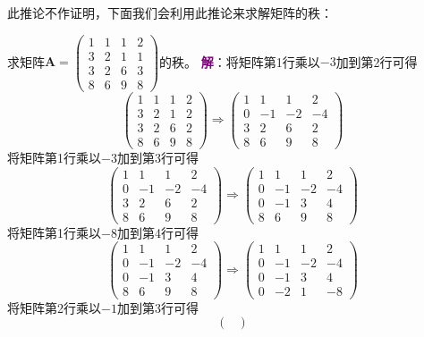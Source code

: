 此推论不作证明，下面我们会利用此推论来求解矩阵的秩：

\begin{example}
	求矩阵$\mathbf{A}=\begin{pmatrix}
		1 & 1 & 1 & 2\\
		3 & 2 & 1 & 1\\
		3 & 2 & 6 & 3\\
		8 & 6 & 9 & 8
	   \end{pmatrix}$的秩。
	   \tcblower
	   \textcolor{purple}{\textbf{解}}：将矩阵第1行乘以$-3$加到第2行可得
	   $$
	   \begin{pmatrix}
		1 & 1 & 1 & 2\\
		3 & 2 & 1 & 2\\
		3 & 2 & 6 & 2\\
		8 & 6 & 9 & 8
	   \end{pmatrix}\Longrightarrow\begin{pmatrix}
		1 & 1 & 1 & 2\\
		0 & -1 & -2 & -4\\
		3 & 2 & 6 & 2\\
		8 & 6 & 9 & 8
	   \end{pmatrix}
	   $$将矩阵第1行乘以$-3$加到第3行可得$$\begin{pmatrix}
		1 & 1 & 1 & 2\\
		0 & -1 & -2 & -4\\
		3 & 2 & 6 & 2\\
		8 & 6 & 9 & 8
	   \end{pmatrix}\Longrightarrow\begin{pmatrix}
		1 & 1 & 1 & 2\\
		0 & -1 & -2 & -4\\
		0 & -1 & 3 & 4\\
		8 & 6 & 9 & 8
	   \end{pmatrix}$$将矩阵第1行乘以$-8$加到第4行可得$$\begin{pmatrix}
		1 & 1 & 1 & 2\\
		0 & -1 & -2 & -4\\
		0 & -1 & 3 & 4\\
		8 & 6 & 9 & 8
	   \end{pmatrix}\Longrightarrow\begin{pmatrix}
		1 & 1 & 1 & 2\\
		0 & -1 & -2 & -4\\
		0 & -1 & 3 & 4\\
		0 & -2 & 1 & -8
	   \end{pmatrix}$$将矩阵第2行乘以$-1$加到第3行可得$$\begin{pmatrix}

\end{pmatrix}$$
\end{example}
